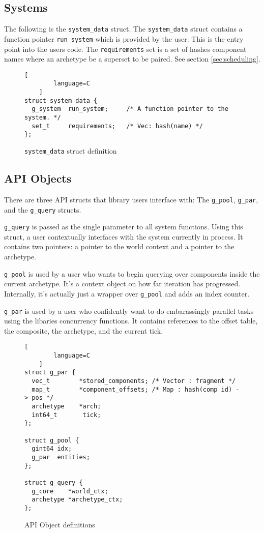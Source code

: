 \subsection{Systems}
The following is the \texttt{system\_data} struct. The \texttt{system\_data} struct contains a function pointer \texttt{run\_system} which is provided by the user. This is the entry point into the users code. The \texttt{requirements} set is a set of hashes component names where an archetype be a superset to be paired. See section \ref{sec:scheduling}.

\begin{figure}[H]
    \begin{lstlisting}[
        language=C
    ]
struct system_data {
  g_system  run_system;     /* A function pointer to the system. */
  set_t     requirements;   /* Vec: hash(name) */
};
    \end{lstlisting}
    \caption{\texttt{system\_data} struct definition}
    \label{code:sd_and_er}
\end{figure}

\subsection{API Objects}
There are three API structs that library users interface with: The \texttt{g\_pool}, \texttt{g\_par}, and the \texttt{g\_query} structs. 

\texttt{g\_query} is passed as the single parameter to all system functions. Using this struct, a user contextually interfaces with the system currently in process. It contains two pointers: a pointer to the world context and a pointer to the archetype.

\texttt{g\_pool} is used by a user who wants to begin querying over components inside the current archetype. It's a context object on how far iteration has progressed. Internally, it's actually just a wrapper over \texttt{g\_pool} and adds an index counter.

\texttt{g\_par} is used by a user who confidently want to do embarassingly parallel tasks using the libaries concurrency functions. It contains references to the offset table, the composite, the archetype, and the current tick.


\begin{figure}[htbp]
    \begin{lstlisting}[
        language=C
    ]
struct g_par {
  vec_t        *stored_components; /* Vector : fragment */
  map_t        *component_offsets; /* Map : hash(comp id) -> pos */
  archetype    *arch;
  int64_t       tick;
};

struct g_pool {
  gint64 idx;
  g_par  entities;
};

struct g_query {
  g_core    *world_ctx;
  archetype *archetype_ctx;
};
    \end{lstlisting}
    \caption{API Object definitions}
    \label{code:apis}
\end{figure}

